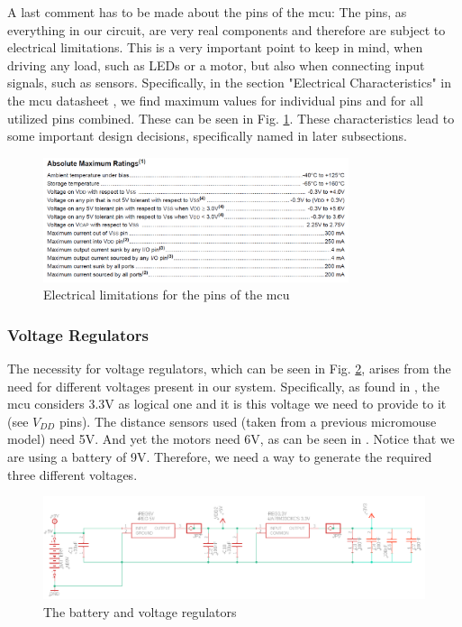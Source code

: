 A last comment has to be made about the pins of the mcu: The pins, as everything in our circuit, are very real components and therefore are subject to electrical limitations. This is a very important point to keep in mind, when driving any load, such as LEDs or a motor, but also when connecting input signals, such as sensors.
Specifically, in the section "Electrical Characteristics" in the mcu datasheet \cite{mcu}, we find maximum values for individual pins and for all utilized pins combined. These can be seen in Fig. \ref{fig:electrical}. These characteristics lead to some important design decisions, specifically named in later subsections.

\begin{figure}[htb]
    \centering
    \includegraphics[width=0.8\textwidth]{figures/hardware/Electrical.PNG}
    \caption{Electrical limitations for the pins of the mcu}
    \label{fig:electrical}
\end{figure}

\FloatBarrier
\vspace{1cm}

\subsubsection{Voltage Regulators}

The necessity for voltage regulators, which can be seen in Fig. \ref{fig:battery}, arises from the need for different voltages present in our system. 
Specifically, as found in \cite{mcu}, the mcu considers 3.3V as logical one and it is this voltage we need to provide to it (see $V_{DD}$ pins). The distance sensors used (taken from a previous micromouse model) need 5V. And yet the motors need 6V, as can be seen in \cite{motor}. 
Notice that we are using a battery of 9V. Therefore, we need a way to generate the required three different voltages.

\begin{figure}[htb]
    \centering
    \includegraphics[width=1\textwidth]{figures/hardware/VoltageandCapacitors.PNG}
    \caption{The battery and voltage regulators}
    \label{fig:battery}
\end{figure}

